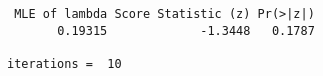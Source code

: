 \begin{verbatim} MLE of lambda Score Statistic (z) Pr(>|z|)
       0.19315             -1.3448   0.1787

iterations =  10 
\end{verbatim}
